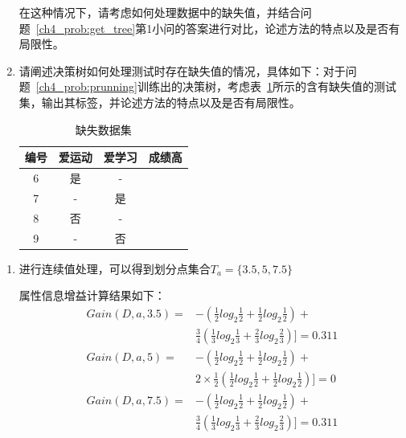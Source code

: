 \documentclass[answers]{exam}  %
\begin{document}
\begin{questions}
\begin{enumerate}
\begin{table}[ht]
\begin{tabular}{ccc|c}
                  \end{tabular}
              \end{table}
              在这种情况下，请考虑如何处理数据中的缺失值，并结合问题~\ref{ch4_prob:get_tree}第1小问的答案进行对比，论述方法的特点以及是否有局限性。
        \item 请阐述决策树如何处理测试时存在缺失值的情况，具体如下：对于问题~\ref{ch4_prob:prunning}训练出的决策树，考虑表~\ref{ch4_tab:artificial_testing_dataset2}所示的含有缺失值的测试集，输出其标签，并论述方法的特点以及是否有局限性。
              \begin{table}[ht]
                  \centering
                  \caption{缺失数据集}\label{ch4_tab:artificial_testing_dataset2}
                  \begin{tabular}{cccc}
                      \hline 编号 & 爱运动 & 爱学习 & 成绩高 \\
                      \hline 6    & 是     & -      &        \\
                      7           & -      & 是     &        \\
                      8           & 否     & -      &        \\
                      9           & -      & 否     &        \\
                      \hline
                  \end{tabular}
              \end{table}

    \end{enumerate}
    \begin{solution}
        \begin{enumerate}
            \item 	    进行连续值处理，可以得到划分点集合$T_a=\{3.5,5,7.5\}$

                  属性信息增益计算结果如下：
                  \begin{align*}
                      Gain(D,a,3.5)= & -(\frac{1}{2}log_2\frac{1}{2}+\frac{1}{2}log_2\frac{1}{2})+ \\&\frac{3}{4}(\frac{1}{3}log_2\frac{1}{3}+\frac{2}{3}log_2\frac{2}{3})]=0.311\\
                      Gain(D,a,5)=   & -(\frac{1}{2}log_2\frac{1}{2}+\frac{1}{2}log_2\frac{1}{2})+ \\&2\times \frac{1}{2} (\frac{1}{2}log_2\frac{1}{2}+\frac{1}{2}log_2\frac{1}{2})]=0\\
                      Gain(D,a,7.5)= & -(\frac{1}{2}log_2\frac{1}{2}+\frac{1}{2}log_2\frac{1}{2})+ \\&\frac{3}{4}(\frac{1}{3}log_2\frac{1}{3}+\frac{2}{3}log_2\frac{2}{3})]=0.311
                  \end{align*}


\end{enumerate}
\end{solution}
\end{questions}
\end{document}
